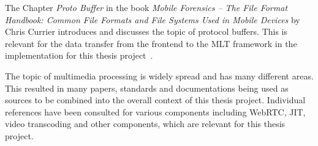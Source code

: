 \documentclass[../MasterThesis.tex]{subfiles}
\begin{document}
\begin{description}[font=\color{RedViolet!80!black}, style=nextline]
		
		
	
		
		
		\item[Protocol buffer] 
		
		The Chapter \textit{Proto Buffer} in the book \textit{Mobile Forensics -- The File Format Handbook: Common File Formats and File Systems Used in Mobile Devices} by Chris Currier introduces and discusses the topic of protocol buffers. This is relevant for the data transfer from the frontend to the MLT framework in the implementation for this thesis project~\cite{protobuffer}.
		
		
		
	
		\newpage
		
		\item[Multimedia processing] 
		
		The topic of multimedia processing is widely spread and has many different areas. This resulted in many papers, standards and documentations being used as sources to be combined into the overall context of this thesis project. Individual references have been consulted for various components including WebRTC, JIT, video transcoding and other components, which are relevant for this thesis project.
		
		
		
		
		
		

		
		
		
		
		
	\end{description}
	
	
	
	
	
	
	
	
	
\end{document}
